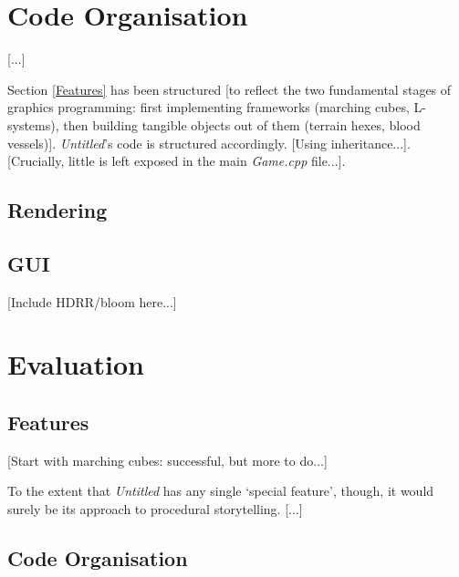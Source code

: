 \documentclass[a4paper, 11pt]{article}
\begin{document}
\begin{flushleft}
\vspace{5pt}
 
\section{Code Organisation}

[...]

\vspace{5pt}\noindent
Section \ref{Features} has been structured [to reflect the two fundamental stages of graphics programming: first implementing frameworks (marching cubes, L-systems), then building tangible objects out of them (terrain hexes, blood vessels)]. \textit{Untitled}'s code is structured accordingly. [Using inheritance...]. [Crucially, little is left exposed in the main \textit{Game.cpp} file...].


\subsection{Rendering}

\subsection{GUI}

[Include HDRR/bloom here...]

\section{Evaluation}\label{Evaluation}

\subsection{Features}

[Start with marching cubes: successful, but more to do...]

\vspace{5pt}

\vspace{5pt}\noindent
To the extent that \textit{Untitled} has any single `special feature', though, it would surely be its approach to procedural storytelling. [...]

\subsection{Code Organisation}


\end{flushleft}
\end{document}
